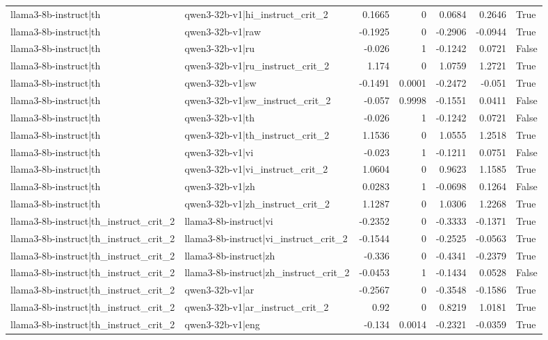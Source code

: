 \begin{table}
\begin{tabular}{l l r r r r l}
llama3-8b-instruct|th & qwen3-32b-v1|hi_instruct_crit_2 & 0.1665 & 0 & 0.0684 & 0.2646 & True \\
llama3-8b-instruct|th & qwen3-32b-v1|raw & -0.1925 & 0 & -0.2906 & -0.0944 & True \\
llama3-8b-instruct|th & qwen3-32b-v1|ru & -0.026 & 1 & -0.1242 & 0.0721 & False \\
llama3-8b-instruct|th & qwen3-32b-v1|ru_instruct_crit_2 & 1.174 & 0 & 1.0759 & 1.2721 & True \\
llama3-8b-instruct|th & qwen3-32b-v1|sw & -0.1491 & 0.0001 & -0.2472 & -0.051 & True \\
llama3-8b-instruct|th & qwen3-32b-v1|sw_instruct_crit_2 & -0.057 & 0.9998 & -0.1551 & 0.0411 & False \\
llama3-8b-instruct|th & qwen3-32b-v1|th & -0.026 & 1 & -0.1242 & 0.0721 & False \\
llama3-8b-instruct|th & qwen3-32b-v1|th_instruct_crit_2 & 1.1536 & 0 & 1.0555 & 1.2518 & True \\
llama3-8b-instruct|th & qwen3-32b-v1|vi & -0.023 & 1 & -0.1211 & 0.0751 & False \\
llama3-8b-instruct|th & qwen3-32b-v1|vi_instruct_crit_2 & 1.0604 & 0 & 0.9623 & 1.1585 & True \\
llama3-8b-instruct|th & qwen3-32b-v1|zh & 0.0283 & 1 & -0.0698 & 0.1264 & False \\
llama3-8b-instruct|th & qwen3-32b-v1|zh_instruct_crit_2 & 1.1287 & 0 & 1.0306 & 1.2268 & True \\
llama3-8b-instruct|th_instruct_crit_2 & llama3-8b-instruct|vi & -0.2352 & 0 & -0.3333 & -0.1371 & True \\
llama3-8b-instruct|th_instruct_crit_2 & llama3-8b-instruct|vi_instruct_crit_2 & -0.1544 & 0 & -0.2525 & -0.0563 & True \\
llama3-8b-instruct|th_instruct_crit_2 & llama3-8b-instruct|zh & -0.336 & 0 & -0.4341 & -0.2379 & True \\
llama3-8b-instruct|th_instruct_crit_2 & llama3-8b-instruct|zh_instruct_crit_2 & -0.0453 & 1 & -0.1434 & 0.0528 & False \\
llama3-8b-instruct|th_instruct_crit_2 & qwen3-32b-v1|ar & -0.2567 & 0 & -0.3548 & -0.1586 & True \\
llama3-8b-instruct|th_instruct_crit_2 & qwen3-32b-v1|ar_instruct_crit_2 & 0.92 & 0 & 0.8219 & 1.0181 & True \\
llama3-8b-instruct|th_instruct_crit_2 & qwen3-32b-v1|eng & -0.134 & 0.0014 & -0.2321 & -0.0359 & True \\

\end{tabular}
\end{table}

